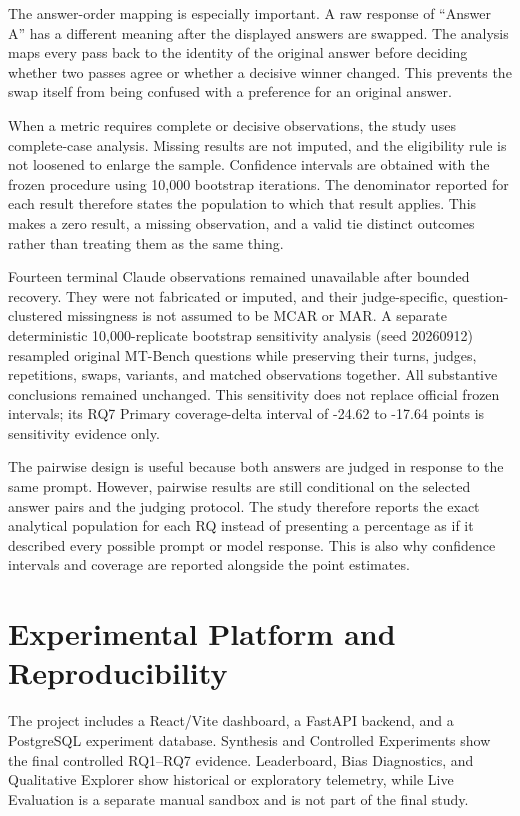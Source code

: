 \documentclass[11pt,a4paper]{article}
\begin{document}
The answer-order mapping is especially important. A raw response of ``Answer A'' has a different meaning after the displayed answers are swapped. The analysis maps every pass back to the identity of the original answer before deciding whether two passes agree or whether a decisive winner changed. This prevents the swap itself from being confused with a preference for an original answer.

When a metric requires complete or decisive observations, the study uses complete-case analysis. Missing results are not imputed, and the eligibility rule is not loosened to enlarge the sample. Confidence intervals are obtained with the frozen procedure using 10,000 bootstrap iterations. The denominator reported for each result therefore states the population to which that result applies. This makes a zero result, a missing observation, and a valid tie distinct outcomes rather than treating them as the same thing.

Fourteen terminal Claude observations remained unavailable after bounded recovery. They were not fabricated or imputed, and their judge-specific, question-clustered missingness is not assumed to be MCAR or MAR. A separate deterministic 10,000-replicate bootstrap sensitivity analysis (seed 20260912) resampled original MT-Bench questions while preserving their turns, judges, repetitions, swaps, variants, and matched observations together. All substantive conclusions remained unchanged. This sensitivity does not replace official frozen intervals; its RQ7 Primary coverage-delta interval of -24.62 to -17.64 points is sensitivity evidence only.

The pairwise design is useful because both answers are judged in response to the same prompt. However, pairwise results are still conditional on the selected answer pairs and the judging protocol. The study therefore reports the exact analytical population for each RQ instead of presenting a percentage as if it described every possible prompt or model response. This is also why confidence intervals and coverage are reported alongside the point estimates.

\section{Experimental Platform and Reproducibility}

The project includes a React/Vite dashboard, a FastAPI backend, and a PostgreSQL experiment database. Synthesis and Controlled Experiments show the final controlled RQ1--RQ7 evidence. Leaderboard, Bias Diagnostics, and Qualitative Explorer show historical or exploratory telemetry, while Live Evaluation is a separate manual sandbox and is not part of the final study.
\end{document}
